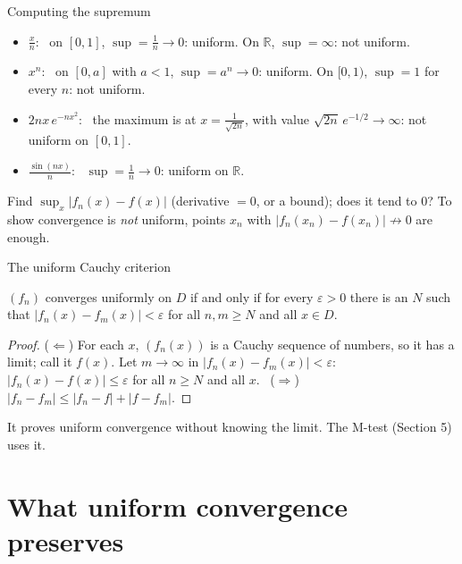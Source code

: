 \documentclass[10pt]{wosm-slides}
\newcommand{\R}{\mathbb{R}}
\begin{document}
\begin{frame}{Computing the supremum}
  \begin{itemize}
    \item $\frac{x}{n}$: \ on $[0, 1]$, $\sup = \frac1n \to 0$: uniform.
      On $\R$, $\sup = \infty$: not uniform.
    \item $x^n$: \ on $[0, a]$ with $a < 1$, $\sup = a^n \to 0$: uniform.
      On $[0, 1)$, $\sup = 1$ for every $n$: not uniform.
    \item $2nx\,e^{-nx^2}$: \ the maximum is at $x = \frac{1}{\sqrt{2n}}$, with value
      $\sqrt{2n}\, e^{-1/2} \to \infty$: not uniform on $[0, 1]$.
    \item $\frac{\sin(nx)}{n}$: \ $\sup = \frac1n \to 0$: uniform on $\R$.
  \end{itemize}
  \pause
  \begin{remark}[Method]
    Find $\sup_x |f_n(x) - f(x)|$ (derivative $= 0$, or a bound); does it tend to $0$?
    To show convergence is \emph{not} uniform, points $x_n$ with
    $|f_n(x_n) - f(x_n)| \not\to 0$ are enough.
  \end{remark}
\end{frame}

\begin{frame}{The uniform Cauchy criterion}
  \begin{theorem}
    $(f_n)$ converges uniformly on $D$ if and only if for every $\varepsilon > 0$ there is
    an $N$ such that $|f_n(x) - f_m(x)| < \varepsilon$ for all $n, m \ge N$ and all $x \in D$.
  \end{theorem}
  \pause
  \begin{proof}
    ($\Leftarrow$) For each $x$, $(f_n(x))$ is a Cauchy sequence of numbers, so it has a limit;
    call it $f(x)$. Let $m \to \infty$ in $|f_n(x) - f_m(x)| < \varepsilon$:
    $|f_n(x) - f(x)| \le \varepsilon$ for all $n \ge N$ and all $x$.
    \ ($\Rightarrow$) $|f_n - f_m| \le |f_n - f| + |f - f_m|$.
  \end{proof}
  It proves uniform convergence without knowing the limit. The M-test (Section 5) uses it.
\end{frame}

\section{What uniform convergence preserves}
\end{document}
